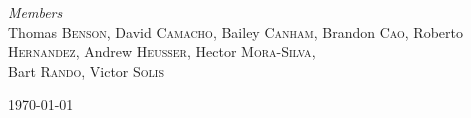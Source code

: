 \begin{titlepage}


	{\large\textit{Members}}\\
	Thomas \textsc{Benson}, %
	David \textsc{Camacho}, %
	Bailey \textsc{Canham}, %
	Brandon \textsc{Cao}, %
	Roberto \textsc{Hernandez}, %
	Andrew \textsc{Heusser}, %
    Hector \textsc{Mora-Silva},\\ %
	Bart \textsc{Rando}, %
	Victor \textsc{Solis} %


	\vfill\vfill\vfill %

	{\large\today} %


	\vfill %

\end{titlepage}



